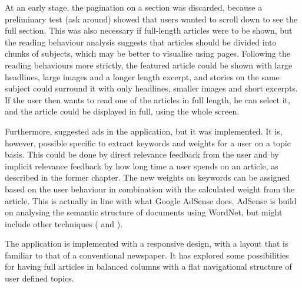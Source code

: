 At an early stage, the pagination on a section was discarded, because a preliminary test (ask around) showed that users wanted to scroll down to see the full section. This was also necessary if full-length articles were to be shown, but the reading behaviour analysis suggests that articles should be divided into chunks of subjects, which may be better to visualise using pages. Following the reading behaviours more strictly, the featured article could be shown with large headlines, large images and a longer length excerpt, and stories on the same subject could surround it with only headlines, smaller images and short excerpts. If the user then wants to read one of the articles in full length, he can select it, and the article could be displayed in full, using the whole screen.%
%

Furthermore, \cite{kristin-fredrik.pdf} suggested ads in the application, but it was implemented. It is, however, possible specific to extract keywords and weights for a user on a topic basis. This could be done by direct relevance feedback from the user and by implicit relevance feedback by how long time a user spends on an article, as described in the former chapter. The new weights on keywords can be assigned based on the user behaviour in combination with the calculated weight from the article. This is actually in line with what Google AdSense does. AdSense is build on analysing the semantic structure of documents using WordNet, but might include other techniques (\cite{Oingo1} and \cite{Oingo2}).

The application is implemented with a responsive design, with a layout that is familiar to that of a conventional newspaper. It has explored some possibilities for having full articles in balanced columns with a flat navigational structure of user defined topics.

